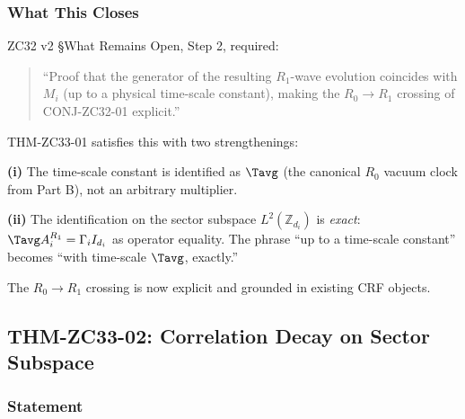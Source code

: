 \documentclass[12pt, a4paper]{article}
\begin{document}
\subsubsection{What This Closes}

\begin{keybox}[title={GAP-ZC29-03 Step 2 closed by THM-ZC33-01}]
ZC32 v2 §What Remains Open, Step 2, required:
\begin{quote}
``Proof that the generator of the resulting $R_1$-wave
evolution coincides with $M_i$ (up to a physical
time-scale constant), making the $R_0\to R_1$ crossing of
CONJ-ZC32-01 explicit.''
\end{quote}
THM-ZC33-01 satisfies this with two strengthenings:

\textbf{(i)} The time-scale constant is identified as
$\Tavg$ (the canonical $R_0$ vacuum clock from Part B),
not an arbitrary multiplier.

\textbf{(ii)} The identification on the sector subspace
$L^2(\mathbb{Z}_{d_i})$ is \emph{exact}: $\Tavg A_i^{R_1}
= \Gamma_i I_{d_i}$ as operator equality. The phrase ``up
to a time-scale constant'' becomes ``with time-scale
$\Tavg$, exactly.''

The $R_0\to R_1$ crossing is now explicit and grounded in
existing CRF objects.
\end{keybox}

\subsection{THM-ZC33-02: Correlation Decay on Sector Subspace}
\label{sec:thm-zc33-02}

\subsubsection{Statement}
\end{document}
